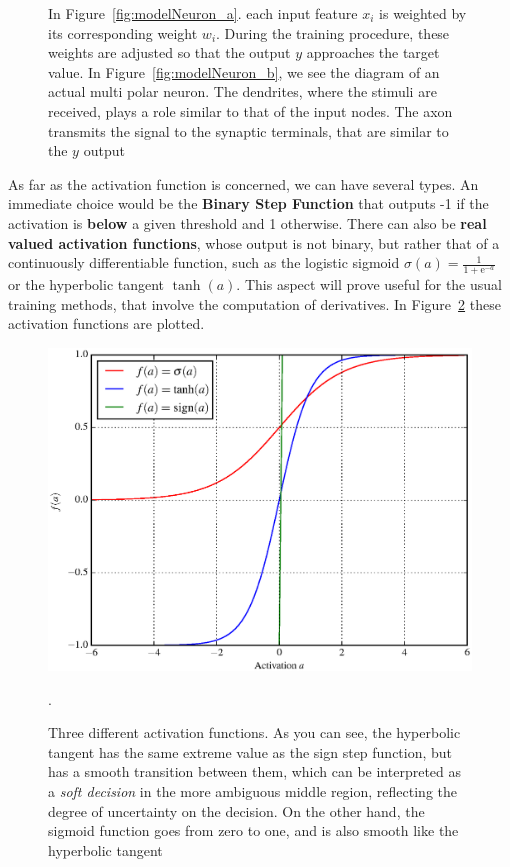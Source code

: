 \begin{figure}[!H]
	\caption{In Figure~\ref{fig:modelNeuron_a}. each input feature $x_i$ is weighted by its corresponding weight $w_i$. During the training procedure, these weights are adjusted so that the output $y$ approaches the target value. In Figure~\ref{fig:modelNeuron_b}, we see the diagram of an actual multi polar neuron. The dendrites, where the stimuli are received, plays a role similar to that of the input nodes. The axon transmits the signal to the synaptic terminals, that are similar to the $y$ output}
	\label{fig:modelNeuron}
\end{figure}


As far as the activation function is concerned, we can have several types. An immediate choice would be the \textbf{Binary Step Function} that  outputs -1 if the activation is \textbf{below} a given threshold and 1 otherwise. There can also be \textbf{real valued activation functions}, whose output is not binary, but rather that of a continuously differentiable function, such as the logistic sigmoid $\sigma(a) = \frac{1}{1 + \mathrm{e}^{-a}}$ or the hyperbolic tangent $\tanh(a)$. This aspect will prove useful for the usual training methods, that involve the computation of derivatives. In Figure~\ref{fig:activFunc} these activation functions are plotted.

\begin{figure}[H]
	\centering
	\includegraphics[width=0.9\linewidth]{figures/activFunc.eps}
	\caption{Three different activation functions. As you can see, the hyperbolic tangent has the same extreme value as the sign step function, but has a smooth transition between them, which can be interpreted as a \emph{soft decision} in the more ambiguous middle region, reflecting the degree of uncertainty on the decision. On the other hand, the sigmoid function goes from zero to one, and is also smooth like the hyperbolic tangent}.
	\label{fig:activFunc}
\end{figure}


